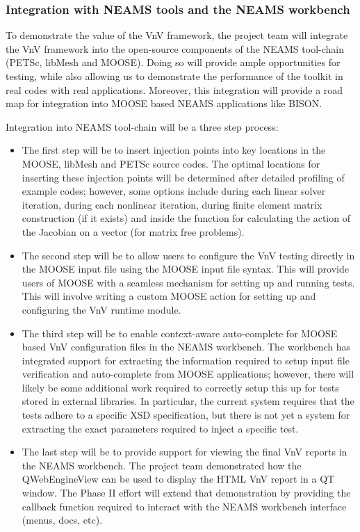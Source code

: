\subsubsection{Integration with NEAMS tools and the NEAMS workbench} 

To demonstrate the value of the VnV framework, the project team will integrate the VnV framework into the open-source components of the NEAMS tool-chain (PETSc, libMesh and MOOSE). Doing so will provide ample opportunities for testing, while also allowing us to demonstrate the performance of the toolkit in real codes with real applications. Moreover, this integration will provide a road map for integration into MOOSE based NEAMS applications like BISON. 

Integration into NEAMS tool-chain will be a three step process:

\begin{itemize}
 \item The first step will be to insert injection points into key locations in the MOOSE, libMesh and PETSc source codes. The optimal locations for inserting these injection points will be determined after detailed profiling of example codes; however, some options include during each linear solver iteration, during each nonlinear iteration, during finite element matrix construction (if it exists) and inside the function for calculating the action of the Jacobian
 on a vector (for matrix free problems). 
 
 \item The second step will be to allow users to configure the VnV testing directly in the MOOSE input file using the MOOSE input file syntax. This will provide users of MOOSE with a seamless mechanism for setting up and running tests. This will involve writing a custom MOOSE action for setting up and configuring the VnV runtime module.
 \item The third step will be to enable context-aware auto-complete for MOOSE based VnV configuration files in the NEAMS workbench. The workbench has integrated support for extracting the information required to setup input file verification and auto-complete from MOOSE applications; however, there will likely be some additional work required to correctly setup this up for tests stored in external libraries. In particular, the current system requires that the tests adhere to a specific XSD specification, but there is not yet a system for extracting the exact parameters required to inject a specific test. 
 \item The last step will be to provide support for viewing the final VnV reports in the NEAMS workbench. The project team demonstrated how the QWebEngineView can be used to display the HTML VnV report in a QT window. The Phase II effort will extend that demonstration by providing the callback function required to interact with the NEAMS workbench interface (menus, docs, etc).
\end{itemize}

